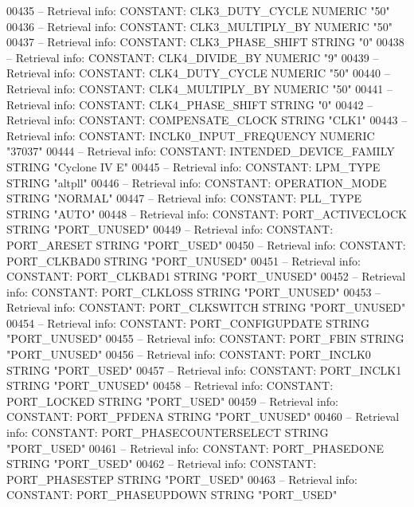 \begin{DoxyCode}
{00435 \textcolor{keyword}{-- Retrieval info: CONSTANT: CLK3\_DUTY\_CYCLE NUMERIC "50"}
00436 \textcolor{keyword}{-- Retrieval info: CONSTANT: CLK3\_MULTIPLY\_BY NUMERIC "50"}
00437 \textcolor{keyword}{-- Retrieval info: CONSTANT: CLK3\_PHASE\_SHIFT STRING "0"}
00438 \textcolor{keyword}{-- Retrieval info: CONSTANT: CLK4\_DIVIDE\_BY NUMERIC "9"}
00439 \textcolor{keyword}{-- Retrieval info: CONSTANT: CLK4\_DUTY\_CYCLE NUMERIC "50"}
00440 \textcolor{keyword}{-- Retrieval info: CONSTANT: CLK4\_MULTIPLY\_BY NUMERIC "50"}
00441 \textcolor{keyword}{-- Retrieval info: CONSTANT: CLK4\_PHASE\_SHIFT STRING "0"}
00442 \textcolor{keyword}{-- Retrieval info: CONSTANT: COMPENSATE\_CLOCK STRING "CLK1"}
00443 \textcolor{keyword}{-- Retrieval info: CONSTANT: INCLK0\_INPUT\_FREQUENCY NUMERIC "37037"}
00444 \textcolor{keyword}{-- Retrieval info: CONSTANT: INTENDED\_DEVICE\_FAMILY STRING "Cyclone IV E"}
00445 \textcolor{keyword}{-- Retrieval info: CONSTANT: LPM\_TYPE STRING "altpll"}
00446 \textcolor{keyword}{-- Retrieval info: CONSTANT: OPERATION\_MODE STRING "NORMAL"}
00447 \textcolor{keyword}{-- Retrieval info: CONSTANT: PLL\_TYPE STRING "AUTO"}
00448 \textcolor{keyword}{-- Retrieval info: CONSTANT: PORT\_ACTIVECLOCK STRING "PORT\_UNUSED"}
00449 \textcolor{keyword}{-- Retrieval info: CONSTANT: PORT\_ARESET STRING "PORT\_USED"}
00450 \textcolor{keyword}{-- Retrieval info: CONSTANT: PORT\_CLKBAD0 STRING "PORT\_UNUSED"}
00451 \textcolor{keyword}{-- Retrieval info: CONSTANT: PORT\_CLKBAD1 STRING "PORT\_UNUSED"}
00452 \textcolor{keyword}{-- Retrieval info: CONSTANT: PORT\_CLKLOSS STRING "PORT\_UNUSED"}
00453 \textcolor{keyword}{-- Retrieval info: CONSTANT: PORT\_CLKSWITCH STRING "PORT\_UNUSED"}
00454 \textcolor{keyword}{-- Retrieval info: CONSTANT: PORT\_CONFIGUPDATE STRING "PORT\_UNUSED"}
00455 \textcolor{keyword}{-- Retrieval info: CONSTANT: PORT\_FBIN STRING "PORT\_UNUSED"}
00456 \textcolor{keyword}{-- Retrieval info: CONSTANT: PORT\_INCLK0 STRING "PORT\_USED"}
00457 \textcolor{keyword}{-- Retrieval info: CONSTANT: PORT\_INCLK1 STRING "PORT\_UNUSED"}
00458 \textcolor{keyword}{-- Retrieval info: CONSTANT: PORT\_LOCKED STRING "PORT\_USED"}
00459 \textcolor{keyword}{-- Retrieval info: CONSTANT: PORT\_PFDENA STRING "PORT\_UNUSED"}
00460 \textcolor{keyword}{-- Retrieval info: CONSTANT: PORT\_PHASECOUNTERSELECT STRING "PORT\_USED"}
00461 \textcolor{keyword}{-- Retrieval info: CONSTANT: PORT\_PHASEDONE STRING "PORT\_USED"}
00462 \textcolor{keyword}{-- Retrieval info: CONSTANT: PORT\_PHASESTEP STRING "PORT\_USED"}
00463 \textcolor{keyword}{-- Retrieval info: CONSTANT: PORT\_PHASEUPDOWN STRING "PORT\_USED"}
}
\end{DoxyCode}
